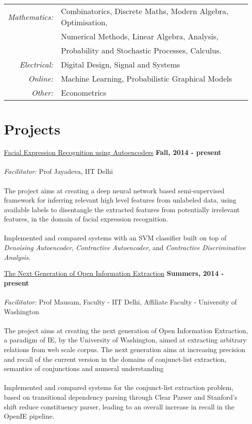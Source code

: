 \documentclass[margin,line]{res}
\begin{document}
\begin{resume}
\begin{tabular}{rlp{5cm}}
\em{Mathematics:} & Combinatorics, Discrete Maths, Modern Algebra, Optimisation,
\\&  Numerical Methods, Linear Algebra, Analysis, 
\\ & Probability and Stochastic Processes, Calculus.\\

\em{Electrical:} & Digital Design, Signal and Systems\\

\em{Online:} & Machine Learning, Probabilistic Graphical Models\\

\em{Other:} &Econometrics\\
\end{tabular}

\section{\sc Projects}

\underline{\sc Facial Expression Recognition using Autoencoders} \hfill {\bf Fall, 2014  - present}\\\\
{\em Facilitator:} Prof Jayadeva, IIT Delhi \\\\
The project aims at creating a deep neural network based semi-supervised framework for inferring relevant high level features from unlabeled data, using available labels to disentangle the extracted features from potentially irrelevant features, in the domain of facial expression recognition.\\\\
Implemented and compared systems with an SVM classifier built on top of {\em Denoising Autoencoder}, {\em Contractive Autoencoder}, and {\em Contractive Discriminative Analysis}.

\underline{\sc The Next Generation of Open Information Extraction} \hfill {\bf Summers, 2014  - present}\\\\
{\em Facilitator:} Prof Mausam, Faculty - IIT Delhi, Affiliate Faculty - University of Washington \\\\
The project aims at creating the next generation of Open Information Extraction, a paradigm of IE, by the University of Washington, aimed at extracting arbitrary relations from web scale corpus. The next generation aims at increasing precision and recall of the current version in the domains of conjunct-list extraction, semantics of conjunctions and numeral understanding \\\\
Implemented and compared systems  for the conjunct-list extraction problem, based on transitional dependency parsing through Clear Parser and Stanford's shift reduce constituency parser, leading to an overall increase in recall in the OpenIE pipeline.\\


\end{resume}
\end{document}
